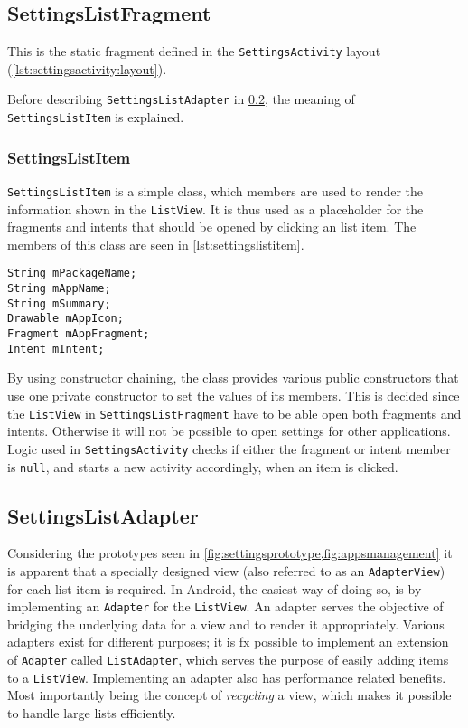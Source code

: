 \subsection{SettingsListFragment}\label{sec:settingslistfragment}
This is the static fragment defined in the \lstinline|SettingsActivity| layout (\cref{lst:settingsactivity:layout}).



Before describing \lstinline|SettingsListAdapter| in \cref{sec:settingslistadapter}, the meaning of \lstinline|SettingsListItem| is explained.

\subsubsection{SettingsListItem}
\lstinline|SettingsListItem| is a simple class, which members are used to render the information shown in the \lstinline|ListView|.
It is thus used as a placeholder for the fragments and intents that should be opened by clicking an list item.
The members of this class are seen in \cref{lst:settingslistitem}.

\begin{lstlisting}[caption={Members of the \lstinline|SettingsListItem| class.}, label={lst:settingslistitem}]
String mPackageName;
String mAppName;
String mSummary;
Drawable mAppIcon;
Fragment mAppFragment;
Intent mIntent;
\end{lstlisting}

By using constructor chaining, the class provides various public constructors that use one private constructor to set the values of its members.
This is decided since the \lstinline|ListView| in \lstinline|SettingsListFragment| have to be able open both fragments and intents.
Otherwise it will not be possible to open settings for other \giraf applications.
Logic used in \lstinline|SettingsActivity| checks if either the fragment or intent member is \lstinline|null|, and starts a new activity accordingly, when an item is clicked.

\subsection{SettingsListAdapter}\label{sec:settingslistadapter}
Considering the prototypes seen in \cref{fig:settingsprototype,fig:appsmanagement} it is apparent that a specially designed view (also referred to as an \lstinline|AdapterView|) for each list item is required.
In Android, the easiest way of doing so, is by implementing an \lstinline|Adapter| for the \lstinline|ListView|.
An adapter serves the objective of bridging the underlying data for a view and to render it appropriately.
Various adapters exist for different purposes; it is fx possible to implement an extension of \lstinline|Adapter| called \lstinline|ListAdapter|, which serves the purpose of easily adding items to a \lstinline|ListView|.
Implementing an adapter also has performance related benefits.
Most importantly being the concept of \textit{recycling} a view, which makes it possible to handle large lists efficiently.

